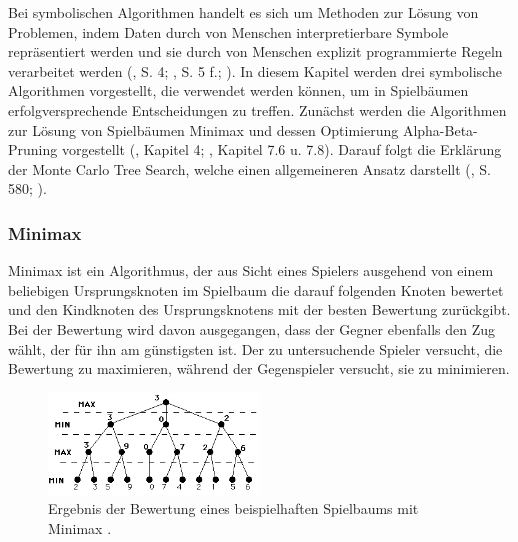 \label{symbolische-algorithmen}

Bei symbolischen Algorithmen handelt es sich um Methoden zur Lösung von Problemen, indem Daten durch von Menschen interpretierbare Symbole repräsentiert werden und sie durch von Menschen explizit programmierte Regeln verarbeitet werden (\cite{Fergus.2022}, S. 4; \cite{Früh.2022}, S. 5 f.; \cite{Garnelo.2019}). In diesem Kapitel werden drei symbolische Algorithmen vorgestellt, die verwendet werden können, um in Spielbäumen erfolgversprechende Entscheidungen zu treffen. Zunächst werden die Algorithmen zur Lösung von Spielbäumen Minimax und dessen Optimierung Alpha-Beta-Pruning vorgestellt (\cite{Ferguson.January2019}, Kapitel 4; \cite{Heineman.October2008}, Kapitel 7.6 u. 7.8). Darauf folgt die Erklärung der Monte Carlo Tree Search, welche einen allgemeineren Ansatz darstellt (\cite{Russell.2020}, S. 580; \cite{Swiechowski.2021}).

\subsubsection{Minimax}

Minimax ist ein Algorithmus, der aus Sicht eines Spielers ausgehend von einem beliebigen Ursprungsknoten im Spielbaum die darauf folgenden Knoten bewertet und den Kindknoten des Ursprungsknotens mit der besten Bewertung zurückgibt. Bei der Bewertung wird davon ausgegangen, dass der Gegner ebenfalls den Zug wählt, der für ihn am günstigsten ist. Der zu untersuchende Spieler versucht, die Bewertung zu maximieren, während der Gegenspieler versucht, sie zu minimieren.


\begin{figure}[ht!]%
	\includegraphics[width=0.5\textwidth, center]{Bilder/minimax.png}
	\caption[Ergebnis der Bewertung eines beispielhaften Spielbaums mit Minimax.]{Ergebnis der Bewertung eines beispielhaften Spielbaums mit Minimax \cite{Morelli_Minimax}.}
	\label{fig:f28}
\end{figure}

